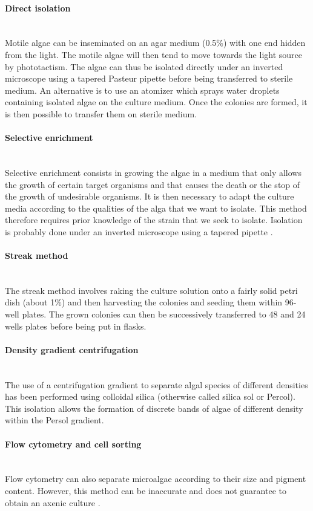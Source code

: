 \paragraph{Direct isolation}\mbox{}\\
Motile algae can be inseminated on an agar medium (0.5\%) with one end hidden from the light. The motile algae will then tend to move towards the light source by phototactism. The algae can thus be isolated directly under an inverted microscope using a tapered Pasteur pipette before being transferred to sterile medium. An alternative is to use an atomizer which sprays water droplets containing isolated algae on the culture medium. Once the colonies are formed, it is then possible to transfer them on sterile medium.
\paragraph{Selective enrichment}\mbox{}\\
Selective enrichment consists in growing the algae in a medium that only allows the growth of certain target organisms and that causes the death or the stop of the growth of undesirable organisms. It is then necessary to adapt the culture media according to the qualities of the alga that we want to isolate. This method therefore requires prior knowledge of the strain that we seek to isolate. Isolation is probably done under an inverted microscope using a tapered pipette \parencite{Richmond2013}.
\paragraph{Streak method}\mbox{}\\
The streak method involves raking the culture solution onto a fairly solid petri dish (about 1\%) and then harvesting the colonies and seeding them within 96-well plates. The grown colonies can then be successively transferred to 48 and 24 wells plates before being put in flasks.
\paragraph{Density gradient centrifugation}\mbox{}\\
The use of a centrifugation gradient to separate algal species of different densities has been performed \parencite{Whitelam1983}using colloidal silica (otherwise called silica sol or Percol). This isolation allows the formation of discrete bands of algae of different density within the Persol gradient.
\paragraph{Flow cytometry and cell sorting}\mbox{}\\
Flow cytometry can also separate microalgae according to their size and pigment content. However, this method can be inaccurate and does not guarantee to obtain an axenic culture \parencite{Richmond2013}.
